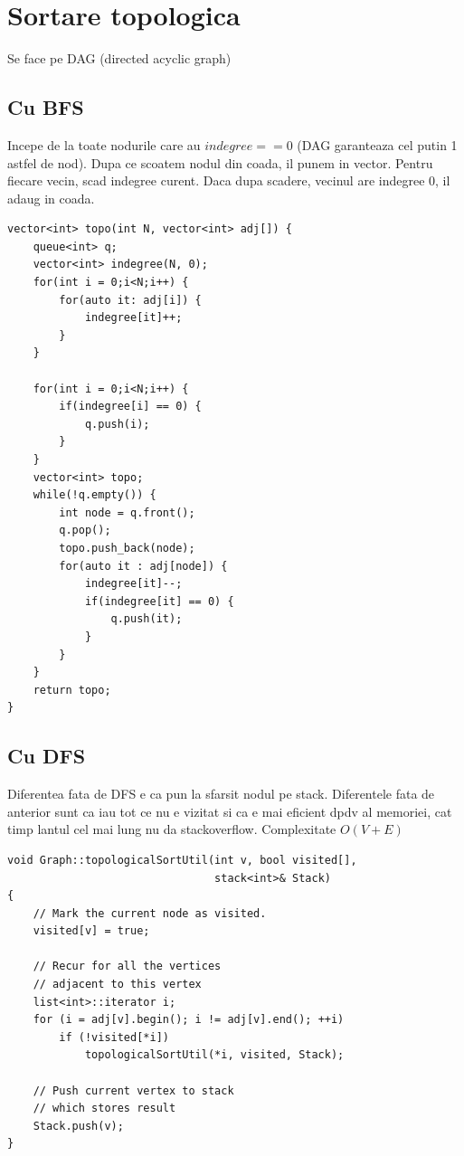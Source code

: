 \documentclass{article}
\begin{document}
\section{Sortare topologica}
Se face pe DAG (directed acyclic graph)
\subsection*{Cu BFS} Incepe de la toate nodurile care au $indegree == 0$ (DAG garanteaza cel putin 1 astfel de nod). Dupa ce scoatem nodul din coada, il punem in vector. Pentru fiecare vecin, scad indegree curent. Daca dupa scadere, vecinul are indegree 0, il adaug in coada.
\begin{lstlisting}
vector<int> topo(int N, vector<int> adj[]) {
    queue<int> q; 
    vector<int> indegree(N, 0); 
    for(int i = 0;i<N;i++) {
        for(auto it: adj[i]) {
            indegree[it]++; 
        }
    }
    
    for(int i = 0;i<N;i++) {
        if(indegree[i] == 0) {
            q.push(i); 
        }
    }
    vector<int> topo;
    while(!q.empty()) {
        int node = q.front(); 
        q.pop(); 
        topo.push_back(node);
        for(auto it : adj[node]) {
            indegree[it]--;
            if(indegree[it] == 0) {
                q.push(it); 
            }
        }
    }
    return topo;
}
    \end{lstlisting}
\subsection*{Cu DFS} Diferentea fata de DFS e ca pun la sfarsit nodul pe stack. Diferentele fata de anterior sunt ca iau tot ce nu e vizitat si ca e mai eficient dpdv al memoriei, cat timp lantul cel mai lung nu da stackoverflow. Complexitate $O(V+E)$

\begin{lstlisting}
void Graph::topologicalSortUtil(int v, bool visited[],
                                stack<int>& Stack)
{
    // Mark the current node as visited.
    visited[v] = true;
 
    // Recur for all the vertices
    // adjacent to this vertex
    list<int>::iterator i;
    for (i = adj[v].begin(); i != adj[v].end(); ++i)
        if (!visited[*i])
            topologicalSortUtil(*i, visited, Stack);
 
    // Push current vertex to stack
    // which stores result
    Stack.push(v);
}
    \end{lstlisting}
\end{document}

